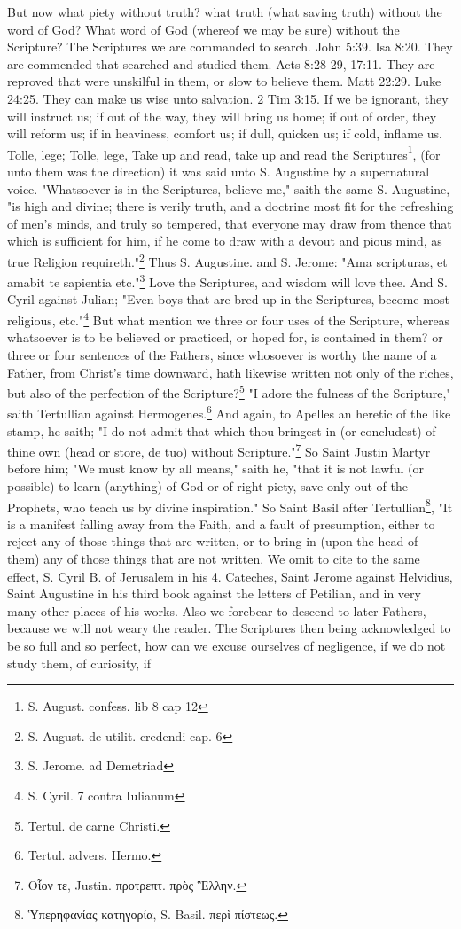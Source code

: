 But now what piety without truth? what truth (what saving truth) without the word of God? What word of God (whereof we may be sure) without the Scripture? The Scriptures we are commanded to search. John 5:39. Isa 8:20. They are commended that searched and studied them. Acts 8:28-29, 17:11. They are reproved that were unskilful in them, or slow to believe them. Matt 22:29. Luke 24:25. They can make us wise unto salvation. 2 Tim 3:15. If we be ignorant, they will instruct us; if out of the way, they will bring us home; if out of order, they will reform us; if in heaviness, comfort us; if dull, quicken us; if cold, inflame us. Tolle, lege; Tolle, lege, Take up and read, take up and read the Scriptures\footnote{S. August. confess. lib 8 cap 12}, (for unto them was the direction) it was said unto S. Augustine by a supernatural voice. "Whatsoever is in the Scriptures, believe me," saith the same S. Augustine, "is high and divine; there is verily truth, and a doctrine most fit for the refreshing of men's minds, and truly so tempered, that everyone may draw from thence that which is sufficient for him, if he come to draw with a devout and pious mind, as true Religion requireth."\footnote{S. August. de utilit. credendi cap. 6} Thus S. Augustine. and S. Jerome: "Ama scripturas, et amabit te sapientia etc."\footnote{S. Jerome. ad Demetriad} Love the Scriptures, and wisdom will love thee. And S. Cyril against Julian; "Even boys that are bred up in the Scriptures, become most religious, etc."\footnote{S. Cyril. 7 contra Iulianum} But what mention we three or four uses of the Scripture, whereas whatsoever is to be believed or practiced, or hoped for, is contained in them? or three or four sentences of the Fathers, since whosoever is worthy the name of a Father, from Christ's time downward, hath likewise written not only of the riches, but also of the perfection of the Scripture?\footnote{Tertul. de carne Christi.} "I adore the fulness of the Scripture," saith Tertullian against Hermogenes.\footnote{Tertul. advers. Hermo.} And again, to Apelles an heretic of the like stamp, he saith; "I do not admit that which thou bringest in (or concludest) of thine own (head or store, de tuo) without Scripture."\footnote{\foreignlanguage{greek}{Οἷον τε, Justin. προτρεπτ. πρὸς Ἓλλην.}} So Saint Justin Martyr before him; "We must know by all means," saith he, "that it is not lawful (or possible) to learn (anything) of God or of right piety, save only out of the Prophets, who teach us by divine inspiration." So Saint Basil after Tertullian\footnote{\foreignlanguage{greek}{Ὑπερηφανίας κατηγορία,} S. Basil. \foreignlanguage{greek}{περὶ πίστεως.}}, "It is a manifest falling away from the Faith, and a fault of presumption, either to reject any of those things that are written, or to bring in (upon the head of them) any of those things that are not written. We omit to cite to the same effect, S. Cyril B. of Jerusalem in his 4. Cateches, Saint Jerome against Helvidius, Saint Augustine in his third book against the letters of Petilian, and in very many other places of his works. Also we forebear to descend to later Fathers, because we will not weary the reader. The Scriptures then being acknowledged to be so full and so perfect, how can we excuse ourselves of negligence, if we do not study them, of curiosity, if 